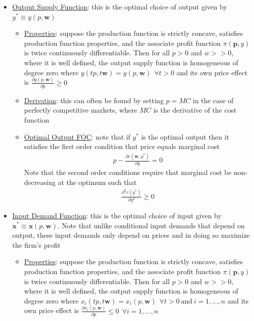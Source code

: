\documentclass{article}
\begin{document}
  \begin{itemize}
    \item  \underline{Output Supply Function}: this is the optimal choice of output given by $y^{*} \equiv y(p, \mathbf{w})$
    \begin{itemize}
      \item  \underline{Properties}: suppose the production function is strictly concave, satisfies production function properties, and the associate profit function $\pi (\mathbf{p},y)$ is twice continuously differentiable. Then for all $p > 0$ and $w >> 0$, where it is well defined, the output supply function is homogeneous of degree zero where $y(tp, t\mathbf{w}) = y(p,\mathbf{w}) \ \ \forall t>0$ and its own price effect is $\tfrac{\partial y(p,\mathbf{w})}{\partial p} \geq 0$
      \item  \underline{Derivation}: this can often be found by setting $p = MC$ in the case of perfectly competitive markets, where $MC$ is the derivative of the cost function
      \item  \underline{Optimal Output FOC}: note that if $y^{*}$ is the optimal output then it satisfies the first order condition that price equals marginal cost
      \begin{gather*}
        p - \frac{\partial c(\mathbf{w}, y^{*})}{\partial y} = 0
      \end{gather*}
      Note that the second order conditions require that marginal cost be non-decreasing at the optimum such that
      \begin{gather*}
        \frac{\partial^{2} c(y^{*})}{\partial y^{2}} \geq 0
      \end{gather*}
    \end{itemize}
    \item  \underline{Input Demand Function}: this is the optimal choice of input given by $\mathbf{x}^{*} \equiv \mathbf{x}(p,\mathbf{w})$. Note that unlike conditional input demands that depend on output, these input demands only depend on prices and in doing so maximize the firm's profit
    \begin{itemize}
      \item  \underline{Properties}: suppose the production function is strictly concave, satisfies production function properties, and the associate profit function $\pi (\mathbf{p},y)$ is twice continuously differentiable. Then for all $p > 0$ and $w >> 0$, where it is well defined, the output supply function is homogeneous of degree zero where $x_{i}(tp, t\mathbf{w}) = x_{i}(p,\mathbf{w}) \ \ \forall t>0 \ \text{and} \ i=1, \dots, n$ and its own price effect is $\tfrac{\partial x_{i}(p,\mathbf{w})}{\partial p} \leq 0 \ \ \forall i = 1, \dots, n$
    \end{itemize}
  \end{itemize}
\end{document}
